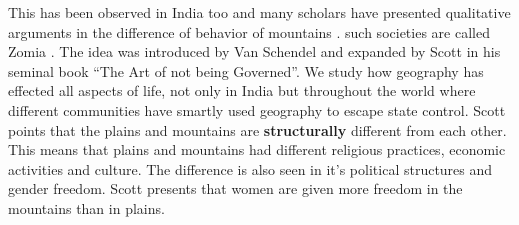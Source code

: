 This has been observed in India too and many scholars have presented qualitative arguments in the difference of behavior of mountains \citep{ali2019delusional,murton2013himalayan,alam2008becoming,hussain2015remoteness}. such societies are called Zomia \citep{van2005geographies}. The idea was introduced by Van Schendel and expanded by Scott in his seminal book ``The Art of not being Governed''. We study how geography has effected all aspects of life, not only in India but throughout the world where different communities have smartly used geography to escape state control. Scott points that the plains and mountains are \textbf{structurally} different from each other. This means that plains and mountains had different religious practices, economic activities and culture. The difference is also seen in it's political structures and gender freedom. Scott presents that women are given more freedom in the mountains than in plains. 